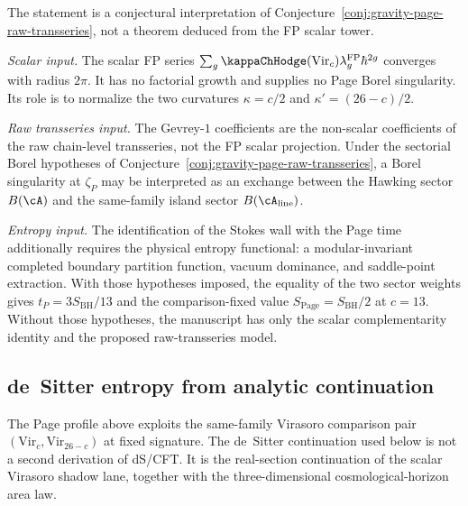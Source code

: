 \begin{remark}
\label{rem:stokes-is-page}
The statement is a conjectural interpretation of
Conjecture~\ref{conj:gravity-page-raw-transseries}, not a theorem
deduced from the FP scalar tower.

\emph{Scalar input.}
The scalar FP series
$\sum_g \kappaChHodge(\mathrm{Vir}_c)
\lambda_g^{\mathrm{FP}}\hbar^{2g}$ converges with
radius $2\pi$. It has no factorial growth and supplies no Page
Borel singularity. Its role is to normalize the two curvatures
$\kappa=c/2$ and $\kappa'=(26-c)/2$.

\emph{Raw transseries input.}
The Gevrey-$1$ coefficients are the non-scalar coefficients of the
raw chain-level transseries, not the FP scalar projection. Under the
sectorial Borel hypotheses of
Conjecture~\ref{conj:gravity-page-raw-transseries}, a Borel
singularity at $\zeta_P$ may be interpreted as an exchange between
the Hawking sector $B(\cA)$ and the same-family island sector
$B(\cA_{\mathrm{line}})$.

\emph{Entropy input.}
The identification of the Stokes wall with the Page time additionally
requires the physical entropy functional: a modular-invariant
completed boundary partition function, vacuum dominance, and
saddle-point extraction. With those hypotheses imposed, the equality
of the two sector weights gives
$t_P=3S_{\mathrm{BH}}/13$ and the comparison-fixed value
$S_{\mathrm{Page}}=S_{\mathrm{BH}}/2$ at $c=13$.
Without those hypotheses, the manuscript has only the scalar
complementarity identity and the proposed raw-transseries model.
\end{remark}

%
%

\subsection{de~Sitter entropy from analytic continuation}
\label{subsec:gravity-desitter}

The Page profile above exploits the same-family Virasoro comparison
pair $(\mathrm{Vir}_c,\mathrm{Vir}_{26-c})$ at fixed signature.
The de~Sitter continuation used below is not a second derivation of
dS/CFT. It is the real-section continuation of the scalar Virasoro
shadow lane, together with the three-dimensional cosmological-horizon
area law.

